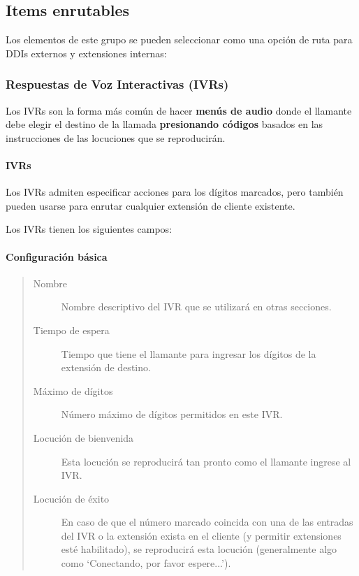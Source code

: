 \documentclass[letterpaper,10pt,spanish]{sphinxmanual}
\begin{document}
\subsection{Items enrutables}
\label{administration_portal/client/vpbx/routing_endpoints/index:routing-endpoints}\label{administration_portal/client/vpbx/routing_endpoints/index::doc}
Los elementos de este grupo se pueden seleccionar como una opción de ruta para DDIs externos y extensiones internas:


\subsubsection{Respuestas de Voz Interactivas (IVRs)}
\label{administration_portal/client/vpbx/routing_endpoints/ivrs:interactive-voice-responses-ivrs}\label{administration_portal/client/vpbx/routing_endpoints/ivrs::doc}
Los IVRs son la forma más común de hacer \textbf{menús de audio} donde el llamante debe elegir el destino de la llamada \textbf{presionando códigos} basados en las instrucciones de las locuciones que se reproducirán.


\paragraph{IVRs}
\label{administration_portal/client/vpbx/routing_endpoints/ivrs:ivrs}\label{administration_portal/client/vpbx/routing_endpoints/ivrs:id1}
Los IVRs admiten especificar acciones para los dígitos marcados, pero también pueden usarse para enrutar cualquier extensión de cliente existente.

Los IVRs tienen los siguientes campos:


\paragraph{Configuración básica}
\label{administration_portal/client/vpbx/routing_endpoints/ivrs:basic-configuration}\begin{quote}
\begin{description}
\item[{Nombre}] \leavevmode
Nombre descriptivo del IVR que se utilizará en otras secciones.

\item[{Tiempo de espera}] \leavevmode
Tiempo que tiene el llamante para ingresar los dígitos de la extensión de destino.

\item[{Máximo de dígitos}] \leavevmode
Número máximo de dígitos permitidos en este IVR.

\item[{Locución de bienvenida}] \leavevmode
Esta locución se reproducirá tan pronto como el llamante ingrese al IVR.

\item[{Locución de éxito}] \leavevmode
En caso de que el número marcado coincida con una de las entradas del IVR o la extensión exista en el cliente (y permitir extensiones esté habilitado), se reproducirá esta locución (generalmente algo como `Conectando, por favor espere...').

\end{description}
\end{quote}
\end{document}
